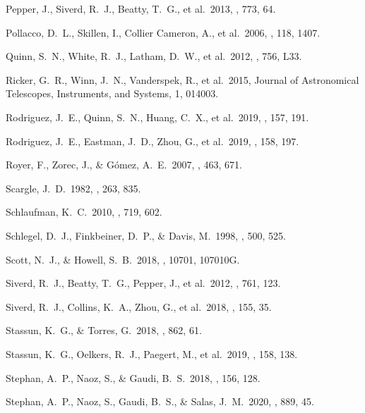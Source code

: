  Pepper, J., Siverd, R.~J., Beatty, T.~G., et al.\ 2013, \apj, 773, 64.

 Pollacco, D.~L., Skillen, I., Collier Cameron, A., et al.\ 2006, \pasp, 118, 1407.

 Quinn, S.~N., White, R.~J., Latham, D.~W., et al.\ 2012, \apjl, 756, L33.

 Ricker, G.~R., Winn, J.~N., Vanderspek, R., et al.\ 2015, Journal of Astronomical Telescopes, Instruments, and Systems, 1, 014003.

 Rodriguez, J.~E., Quinn, S.~N., Huang, C.~X., et al.\ 2019, \aj, 157, 191.

 Rodriguez, J.~E., Eastman, J.~D., Zhou, G., et al.\ 2019, \aj, 158, 197.

 Royer, F., Zorec, J., \& G{\'o}mez, A.~E.\ 2007, \aap, 463, 671.

 Scargle, J.~D.\ 1982, \apj, 263, 835.

 Schlaufman, K.~C.\ 2010, \apj, 719, 602.

 Schlegel, D.~J., Finkbeiner, D.~P., \& Davis, M.\ 1998, \apj, 500, 525.

 Scott, N.~J., \& Howell, S.~B.\ 2018, \procspie, 10701, 107010G.

 Siverd, R.~J., Beatty, T.~G., Pepper, J., et al.\ 2012, \apj, 761, 123.

 Siverd, R.~J., Collins, K.~A., Zhou, G., et al.\ 2018, \aj, 155, 35.

 Stassun, K.~G., \& Torres, G.\ 2018, \apj, 862, 61.

 Stassun, K.~G., Oelkers, R.~J., Paegert, M., et al.\ 2019, \aj, 158, 138.

 Stephan, A.~P., Naoz, S., \& Gaudi, B.~S.\ 2018, \aj, 156, 128.

 Stephan, A.~P., Naoz, S., Gaudi, B.~S., \& Salas, J.~M.\ 2020, \apj, 889, 45.

